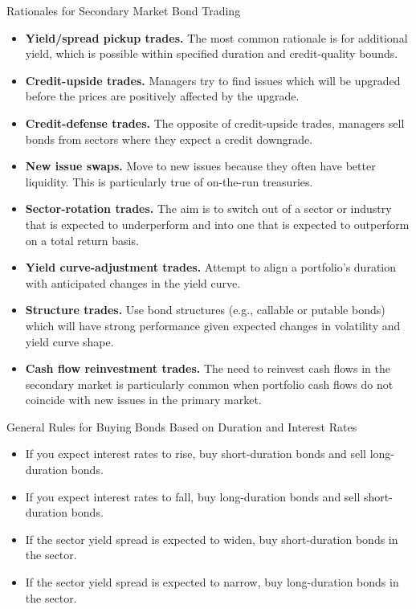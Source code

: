 \documentclass[../custom]{flashcards}
\begin{document}
\begin{flashcard}{Rationales for Secondary Market Bond Trading}
    \begin{itemize}
        \item \textbf{Yield/spread pickup trades.} The most common rationale is for additional yield, which is possible within specified duration and credit-quality bounds.
        \item \textbf{Credit-upside trades.} Managers try to find issues which will be upgraded before the prices are positively affected by the upgrade.
        \item \textbf{Credit-defense trades.} The opposite of credit-upside trades, managers sell bonds from sectors where they expect a credit downgrade.
        \item \textbf{New issue swaps.} Move to new issues because they often have better liquidity. This is particularly true of on-the-run treasuries.
        \item \textbf{Sector-rotation trades.} The aim is to switch out of a sector or industry that is expected to underperform and into one that is expected to outperform on a total return basis.
        \item \textbf{Yield curve-adjustment trades.} Attempt to align a portfolio's duration with anticipated changes in the yield curve.
        \item \textbf{Structure trades.} Use bond structures (e.g., callable or putable bonds) which will have strong performance given expected changes in volatility and yield curve shape.
        \item \textbf{Cash flow reinvestment trades.} The need to reinvest cash flows in the secondary market is particularly common when portfolio cash flows do not coincide with new issues in the primary market.
    \end{itemize}
\end{flashcard}

\begin{flashcard}{General Rules for Buying Bonds Based on Duration and Interest Rates}
    \begin{itemize}
        \item If you expect interest rates to rise, buy short-duration bonds and sell long-duration bonds.
        \item If you expect interest rates to fall, buy long-duration bonds and sell short-duration bonds.
        \item If the sector yield spread is expected to widen, buy short-duration bonds in the sector.
        \item If the sector yield spread is expected to narrow, buy long-duration bonds in the sector.
    \end{itemize}
\end{flashcard}
\end{document}
